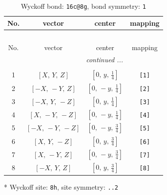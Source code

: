 \documentclass[fleqn,8pt]{jsarticle}
\begin{document}
\renewcommand{\arraystretch}{1.2}
\begin{longtable}{cccc}
\caption{Wyckoff bond: {\tt 16c@8g}, bond symmetry: {\tt 1}}
 \\
 \hline \hline
No. & vector & center & mapping \\ \hline \endfirsthead

\multicolumn{3}{l}{\tablename\ \thetable{}} \\
 \hline \hline
No. & vector & center & mapping \\ \hline \endhead

 \hline \hline
\multicolumn{3}{r}{\footnotesize\it continued ...} \\ \endfoot

 \hline \hline
\multicolumn{3}{r}{} \\ \endlastfoot

1 & $\left[ X,\, Y,\, Z \right]$ & $\left[ 0,\, y,\, \frac{1}{4} \right]$ & {\tt [1]} \\ \hline
2 & $\left[ - X,\, - Y,\, Z \right]$ & $\left[ 0,\, - y,\, \frac{1}{4} \right]$ & {\tt [2]} \\ \hline
3 & $\left[ - X,\, Y,\, - Z \right]$ & $\left[ 0,\, y,\, \frac{1}{4} \right]$ & {\tt [3]} \\ \hline
4 & $\left[ X,\, - Y,\, - Z \right]$ & $\left[ 0,\, - y,\, \frac{1}{4} \right]$ & {\tt [4]} \\ \hline
5 & $\left[ - X,\, - Y,\, - Z \right]$ & $\left[ 0,\, - y,\, \frac{3}{4} \right]$ & {\tt [5]} \\ \hline
6 & $\left[ X,\, Y,\, - Z \right]$ & $\left[ 0,\, y,\, \frac{3}{4} \right]$ & {\tt [6]} \\ \hline
7 & $\left[ X,\, - Y,\, Z \right]$ & $\left[ 0,\, - y,\, \frac{3}{4} \right]$ & {\tt [7]} \\ \hline
8 & $\left[ - X,\, Y,\, Z \right]$ & $\left[ 0,\, y,\, \frac{3}{4} \right]$ & {\tt [8]} \\
\end{longtable}
* Wyckoff site: {\tt 8h}, site symmetry: {\tt ..2}
\renewcommand{\arraystretch}{1.2}
\end{document}
